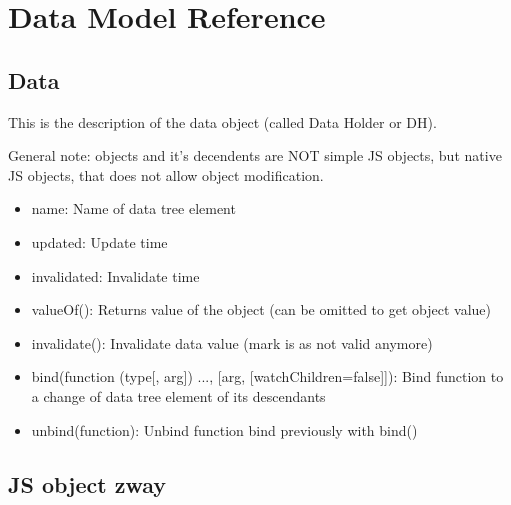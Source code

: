 \chapter{\zway Data Model Reference}
\label{annexdatamodel}

\section{Data}

This is the description of the data object (called Data Holder or DH).

General note: \zway objects and it's decendents are NOT simple JS objects, but native 
JS objects, that does not allow object modification.

\begin {itemize}
\item name: Name of data tree element
\item updated: Update time
\item invalidated: Invalidate time
\item valueOf(): Returns value of the object (can be omitted to get object value)
\item invalidate(): Invalidate data value (mark is as not valid anymore)
\item bind(function (type[, arg]) {...}, [arg, [watchChildren=false]]): Bind function 
to a change of data tree element of its descendants
\item unbind(function): Unbind function bind previously with bind()
\end {itemize}


\section{JS object zway}

